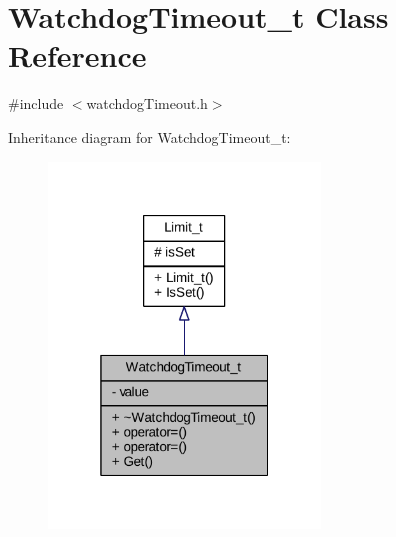 \hypertarget{class_watchdog_timeout__t}{}\section{Watchdog\+Timeout\+\_\+t Class Reference}
\label{class_watchdog_timeout__t}


{\ttfamily \#include $<$watchdog\+Timeout.\+h$>$}



Inheritance diagram for Watchdog\+Timeout\+\_\+t\+:
\nopagebreak
\begin{figure}[H]
\begin{center}
\leavevmode
\includegraphics[width=205pt]{class_watchdog_timeout__t__inherit__graph}
\end{center}
\end{figure}


